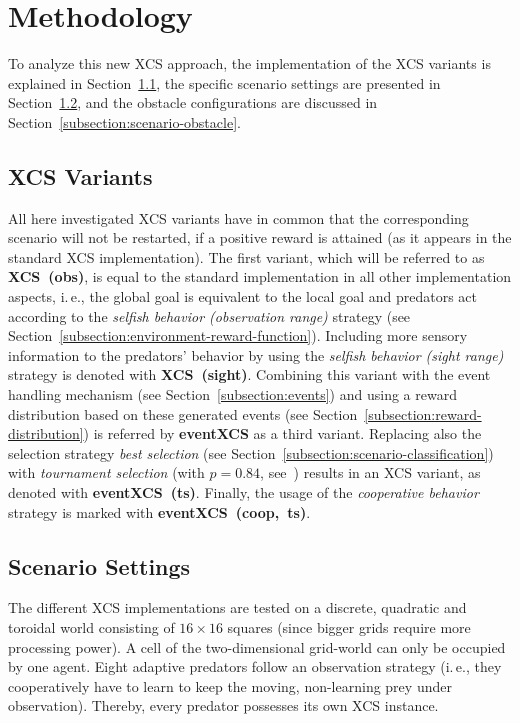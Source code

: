 \documentclass{sig-alternate}
\begin{document}
\section{Methodology}
\label{section:methodology}

To analyze this new XCS approach, the implementation of the XCS variants is explained in Section~\ref{subsection:xcs-variants}, the specific scenario settings are presented in Section~\ref{subsection:scenario-settings}, and the obstacle configurations are discussed in Section~\ref{subsection:scenario-obstacle}.

\subsection{XCS Variants}
\label{subsection:xcs-variants}

All  here investigated XCS variants have in common that the corresponding scenario will not be restarted, if a positive reward is attained (as it appears in the standard XCS implementation). The first variant, which will be referred to as \textbf{XCS~(obs)}, is equal to the standard implementation in all other implementation aspects, i.\,e., the global goal is equivalent to the local goal and predators act according to the \emph{selfish behavior (observation range)} strategy (see Section~\ref{subsection:environment-reward-function}). Including more sensory information to the predators' behavior by using the \emph{selfish behavior (sight range)} strategy is denoted with \textbf{XCS~(sight)}. Combining this variant with the event handling mechanism (see Section~\ref{subsection:events}) and using a reward distribution based on these generated events (see Section~\ref{subsection:reward-distribution}) is referred by \textbf{eventXCS} as a third variant. Replacing also the selection strategy \emph{best selection} (see Section~\ref{subsection:scenario-classification}) with \emph{tournament selection} (with $p = 0.84$, see~\cite{Butz2003}) results in an XCS variant, as denoted with \textbf{eventXCS~(ts)}. Finally, the usage of the \emph{cooperative behavior} strategy is marked with \textbf{eventXCS~(coop,~ts)}.

\subsection{Scenario Settings}
\label{subsection:scenario-settings}

The different XCS implementations are tested %
on a discrete, quadratic and toroidal world consisting of $16 \times 16$ squares (since bigger grids require more processing power). A cell of the two-dimensional grid-world can only be occupied by one agent. 
Eight adaptive predators follow an observation strategy (i.\,e., they cooperatively have to learn to keep the moving, non-learning prey under observation). Thereby, every predator possesses its own XCS instance. 
\end{document}
